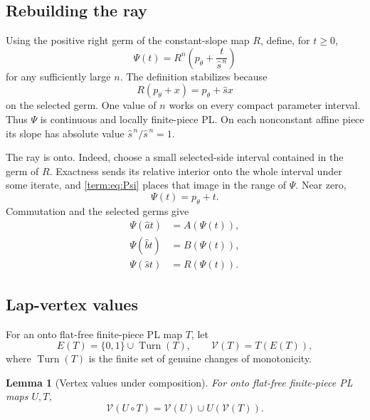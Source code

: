 \documentclass[11pt]{article}
\newtheorem{lemma}[theorem]{Lemma}
\theoremstyle{definition}
\theoremstyle{remark}
\begin{document}
\subsection{Rebuilding the ray}

Using the positive right germ of the constant-slope map \(R\), define, for
\(t\geq0\),
\begin{equation}\label{term:eq:Psi}
 \Psi(t)=R^n\left(p_\theta+\frac{t}{\widehat s^{\,n}}\right)
\end{equation}
for any sufficiently large \(n\).  The definition stabilizes because
\[
 R(p_\theta+x)=p_\theta+\widehat s x
\]
on the selected germ.  One value of \(n\) works on every compact parameter
interval.  Thus \(\Psi\) is continuous and locally finite-piece PL.  On each
nonconstant affine piece its slope has absolute value
\(\widehat s^{\,n}/\widehat s^{\,n}=1\).

The ray is onto.  Indeed, choose a small selected-side interval contained in
the germ of \(R\).  Exactness sends its relative interior onto the whole
interval under some iterate, and \eqref{term:eq:Psi} places that image in the
range of \(\Psi\).  Near zero,
\begin{equation}\label{term:eq:Psi-initial}
 \Psi(t)=p_\theta+t.
\end{equation}
Commutation and the selected germs give
\begin{equation}\label{term:eq:Psi-equivariance}
\begin{split}
 \Psi(\widehat a t)&=A(\Psi(t)),\\
 \Psi(\widehat b t)&=B(\Psi(t)),\\
 \Psi(\widehat s t)&=R(\Psi(t)).
\end{split}
\end{equation}

\subsection{Lap-vertex values}

For an onto flat-free finite-piece PL map $T$, let
\[
 E(T)=\{0,1\}\cup\operatorname{Turn}(T),\qquad
 \mathcal V(T)=T(E(T)),
\]
where $\operatorname{Turn}(T)$ is the finite set of genuine changes of
monotonicity.

\begin{lemma}[Vertex values under composition]
\label{lem:vertex-composition}
For onto flat-free finite-piece PL maps $U,T$,
\begin{equation}\label{term:eq:vertex-composition}
 \mathcal V(U\circ T)=\mathcal V(U)\cup U(\mathcal V(T)).
\end{equation}
\end{lemma}
\end{document}
